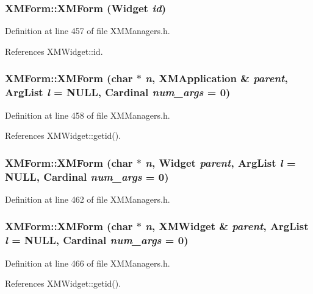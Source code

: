 \subsubsection{\setlength{\rightskip}{0pt plus 5cm}XMForm::XMForm (Widget {\em id})\hspace{0.3cm}{\tt  [inline]}}\label{classXMForm_a1}




Definition at line 457 of file XMManagers.h.

References XMWidget::id.
\subsubsection{\setlength{\rightskip}{0pt plus 5cm}XMForm::XMForm (char $\ast$ {\em n}, {\bf XMApplication} \& {\em parent}, Arg\-List {\em l} = NULL, Cardinal {\em num\_\-args} = 0)\hspace{0.3cm}{\tt  [inline]}}\label{classXMForm_a2}




Definition at line 458 of file XMManagers.h.

References XMWidget::getid().
\subsubsection{\setlength{\rightskip}{0pt plus 5cm}XMForm::XMForm (char $\ast$ {\em n}, Widget {\em parent}, Arg\-List {\em l} = NULL, Cardinal {\em num\_\-args} = 0)\hspace{0.3cm}{\tt  [inline]}}\label{classXMForm_a3}




Definition at line 462 of file XMManagers.h.
\subsubsection{\setlength{\rightskip}{0pt plus 5cm}XMForm::XMForm (char $\ast$ {\em n}, {\bf XMWidget} \& {\em parent}, Arg\-List {\em l} = NULL, Cardinal {\em num\_\-args} = 0)\hspace{0.3cm}{\tt  [inline]}}\label{classXMForm_a4}




Definition at line 466 of file XMManagers.h.

References XMWidget::getid().

